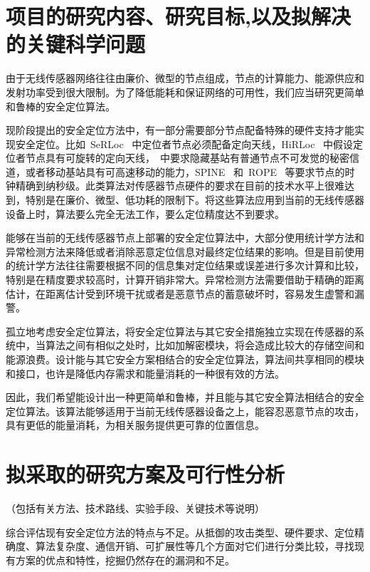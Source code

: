\documentclass[a4paper,10pt]{article}
\begin{document}
\section{项目的研究内容、研究目标,以及拟解决的关键科学问题} 

由于无线传感器网络往往由廉价、微型的节点组成，节点的计算能力、能源供应和发射功率受到很大限制。为了降低能耗和保证网络的可用性，我们应当研究更简单和鲁棒的安全定位算法。

现阶段提出的安全定位方法中，有一部分需要部分节点配备特殊的硬件支持才能实现安全定位。比如~SeRLoc \cite{Lazos2005}~中定位者节点必须配备定向天线，HiRLoc \cite{Lazos2005a}~中假设定位者节点具有可旋转的定向天线，\cite{Capkun2006a, Capkun2008}~中要求隐藏基站有普通节点不可发觉的秘密信道，或者移动基站具有可高速移动的能力，SPINE \cite{Capkun2006}~和~ROPE \cite{Lazos2006}~等要求节点的时钟精确到纳秒级。此类算法对传感器节点硬件的要求在目前的技术水平上很难达到，特别是在廉价、微型、低功耗的限制下。将这些算法应用到当前的无线传感器设备上时，算法要么完全无法工作，要么定位精度达不到要求。

能够在当前的无线传感器节点上部署的安全定位算法中，大部分使用统计学方法和异常检测方法来降低或者消除恶意定位信息对最终定位结果的影响。但是目前使用的统计学方法往往需要根据不同的信息集对定位结果或误差进行多次计算和比较，特别是在精度要求较高时，计算开销非常大。异常检测方法需要借助于精确的距离估计，在距离估计受到环境干扰或者是恶意节点的蓄意破坏时，容易发生虚警和漏警。

孤立地考虑安全定位算法，将安全定位算法与其它安全措施独立实现在传感器的系统中，当算法之间有相似之处时，比如加解密模块，将会造成比较大的存储空间和能源浪费。设计能与其它安全方案相结合的安全定位算法，算法间共享相同的模块和接口，也许是降低内存需求和能量消耗的一种很有效的方法。

因此，我们希望能设计出一种更简单和鲁棒，并且能与其它安全算法相结合的安全定位算法。该算法能够适用于当前无线传感器设备之上，能容忍恶意节点的攻击，具有更低的能量消耗，为相关服务提供更可靠的位置信息。

\section{拟采取的研究方案及可行性分析} 

（包括有关方法、技术路线、实验手段、关键技术等说明）

综合评估现有安全定位方法的特点与不足。从抵御的攻击类型、硬件要求、定位精确度、算法复杂度、通信开销、可扩展性等几个方面对它们进行分类比较，寻找现有方案的优点和特性，挖掘仍然存在的漏洞和不足。
\end{document}
